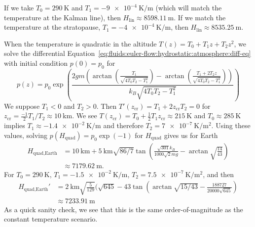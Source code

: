 \begin{node}[Hydrostatics]
\begin{node}[Atmosphere]
\begin{node}
If we take $T_{0}=\qty{290}{\kelvin}$ and
$T_{1}=\qty{-9e-4}{\kelvin\per\meter}$ (which will match the temperature
at the Kalman line),
then $H_{\text{lin}}\approx\qty{8598.11}{\meter}$.
If we match the temperature at the stratopause,
$T_{1}=\qty{-4e-4}{\kelvin\per\meter}$,
then $H_{\text{lin}}\approx\qty{8535.25}{\meter}$. 
\end{node}

\begin{node}\label{fluids:euler-flow-000C}%
When the temperature is quadratic in the altitude $T(z)=T_{0}+T_{1}z+T_{2}z^{2}$,
we solve the differential Equation~\eqref{eq:fluids:euler-flow:hydrostatic:atmosphere:diff-eq}
with initial condition $p(0)=p_{0}$ for
\begin{equation}
p(z) = p_{0}\exp \left(\frac{2 g m \left(\arctan\left(\frac{T_{1}}{\sqrt{4
    T_{0} T_{2}-T_{1}^{2}}}\right)-\arctan\left(\frac{T_{1}+2 T_{2} z}{\sqrt{4 T_{0}
    T_{2}-T_{1}^{2}}}\right)\right)}{k_{B} \sqrt{4 T_{0} T_{2}-T_{1}^{2}}}\right)
\end{equation}
We suppose $T_{1}<0$ and $T_{2}>0$. Then $T'(z_{\text{cr}})=T_{1}+2z_{\text{cr}}T_{2}=0$ for $z_{\text{cr}}=\frac{-1}{2}T_{1}/T_{2}\approx\qty{10}{\kilo\meter}$.
We see $T(z_{\text{cr}})=T_{0}+\frac{1}{2}T_{1}z_{\text{cr}}\approx\qty{215}{\kelvin}$
and $T_{0}\approx\qty{285}{\kelvin}$ implies $T_{1}\approx\qty{-1.4e-2}{\kelvin\per\meter}$
and therefore $T_{2}=\qty{7e-7}{\kelvin\per\meter\squared}$. Using these
values, solving $p(H_{\text{quad}})=p_{0}\exp(-1)$ for $H_{\text{quad}}$
gives us for Earth
\begin{equation}
  \begin{split}
H_{\text{quad},\text{Earth}}&=\qty{10}{\kilo\meter}+\qty{5}{\kilo\meter}\sqrt{86/7}\tan\left(\frac{\sqrt{301}k_{B}}{1000\sqrt{2}mg}-\arctan\sqrt{\frac{14}{43}}\right)\\
&\approx\qty{7179.62}{\meter}.
  \end{split}
\end{equation}
For $T_{0}=\qty{290}{\kelvin}$, $T_{1}=\qty{-1.5e-2}{\kelvin\per\meter}$,
$T_{2}=\qty{7.5e-7}{\kelvin\per\meter\squared}$,
and then 
\begin{equation}
\begin{split}
H_{\text{quad},\text{Earth}}'&= \qty{2}{\kilo\meter}\sqrt{\frac{5}{129}}(\sqrt{645}-43\tan\left(\arctan\sqrt{15/43}-\frac{188727}{20000\sqrt{645}}\right)\\
&\approx\qty{7233.91}{\meter}
\end{split}
\end{equation}
As a quick sanity check, we see that this is the same order-of-magnitude
as the constant temperature scenario.
\end{node}
\end{node}


\end{node}
